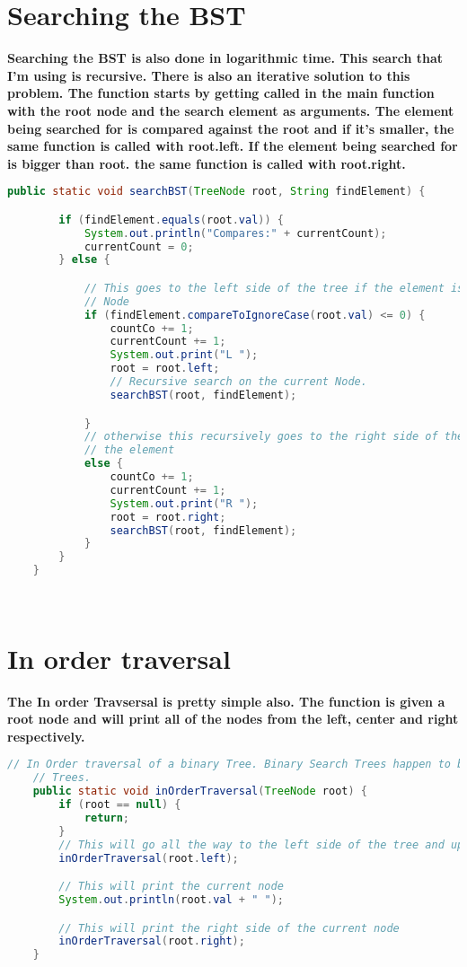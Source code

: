 \documentclass{article}
\begin{document}
\section{Searching the BST}
\textbf{Searching the BST is also done in logarithmic time. This search that I'm using is recursive. There is also an iterative solution to this problem. The function starts by getting called in the main function with the root node and the search element as arguments. The element being searched for is compared against the root and if it's smaller, the same function is called with root.left. If the element being searched for is bigger than root. the same function is called with root.right.}
\begin{lstlisting}[language = java]
public static void searchBST(TreeNode root, String findElement) {

        if (findElement.equals(root.val)) {
            System.out.println("Compares:" + currentCount);
            currentCount = 0;
        } else {

            // This goes to the left side of the tree if the element is less than the root
            // Node
            if (findElement.compareToIgnoreCase(root.val) <= 0) {
                countCo += 1;
                currentCount += 1;
                System.out.print("L ");
                root = root.left;
                // Recursive search on the current Node.
                searchBST(root, findElement);

            }
            // otherwise this recursively goes to the right side of the tree until we find
            // the element
            else {
                countCo += 1;
                currentCount += 1;
                System.out.print("R ");
                root = root.right;
                searchBST(root, findElement);
            }
        }
    }

    
\end{lstlisting}
\section{In order traversal}
\textbf{The In order Travsersal is pretty simple also. The function is given a root node and will print all of the nodes from the left, center and right respectively.}
\begin{lstlisting}[language = java]
// In Order traversal of a binary Tree. Binary Search Trees happen to be Binary
    // Trees.
    public static void inOrderTraversal(TreeNode root) {
        if (root == null) {
            return;
        }
        // This will go all the way to the left side of the tree and up.
        inOrderTraversal(root.left);

        // This will print the current node
        System.out.println(root.val + " ");

        // This will print the right side of the current node
        inOrderTraversal(root.right);
    }
\end{lstlisting}
\end{document}
